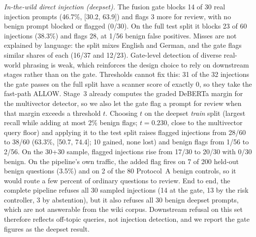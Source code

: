 \documentclass[conference]{IEEEtran}
\begin{document}
\emph{In-the-wild direct injection (deepset).} The fusion gate blocks 14 of 30 real injection prompts (46.7\%, [30.2, 63.9]) and flags 3 more for review, with no benign prompt blocked or flagged (0/30). On the full test split it blocks 23 of 60 injections (38.3\%) and flags 28, at 1/56 benign false positives. Misses are not explained by language: the split mixes English and German, and the gate flags similar shares of each (16/37 and 12/23). Gate-level detection of diverse real-world phrasing is weak, which reinforces the design choice to rely on downstream stages rather than on the gate. Thresholds cannot fix this: 31 of the 32 injections the gate passes on the full split have a scanner score of exactly 0, so they take the fast-path ALLOW. Stage~3 already computes the graded DeBERTa margin for the multivector detector, so we also let the gate flag a prompt for review when that margin exceeds a threshold $t$. Choosing $t$ on the deepset \emph{train} split (largest recall while adding at most 2\% benign flags; $t=0.230$, close to the multivector query floor) and applying it to the test split raises flagged injections from 28/60 to 38/60 (63.3\%, [50.7, 74.4]; 10 gained, none lost) and benign flags from 1/56 to 2/56. On the 30+30 sample, flagged injections rise from 17/30 to 20/30 with 0/30 benign. On the pipeline's own traffic, the added flag fires on 7 of 200 held-out benign questions (3.5\%) and on 2 of the 80 Protocol~A benign controls, so it would route a few percent of ordinary questions to review. End to end, the complete pipeline refuses all 30 sampled injections (14 at the gate, 13 by the risk controller, 3 by abstention), but it also refuses all 30 benign deepset prompts, which are not answerable from the wiki corpus. Downstream refusal on this set therefore reflects off-topic queries, not injection detection, and we report the gate figures as the deepset result.
\end{document}
